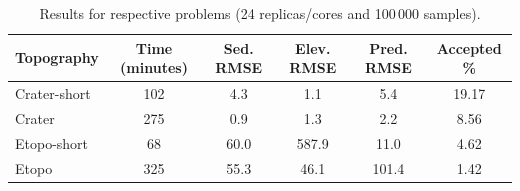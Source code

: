 \documentclass[final,5p,times,twocolumn]{elsarticle}
\begin{document}
 
 
 \begin{table}[htbp!]
 \centering
 \small
  \begin{tabular}{ l c c c c c} 
  \hline\hline
 Topography & Time (minutes) & Sed. RMSE &  Elev. RMSE   & Pred. RMSE & Accepted \%  \\  
  \hline\hline
 Crater-short & 	102	& 4.3	& 	1.1 &   5.4 & 19.17 \\
 Crater & 	275	& 0.9	& 1.3  	&  2.2 & 8.56 \\
 Etopo-short & 	68	& 60.0	& 587.9	&   11.0 &  4.62 \\
 Etopo &	325	& 55.3	& 46.1 &    101.4	 & 1.42 \\
  \hline
  \end{tabular}
 
 \caption{Results for respective problems (24 replicas/cores and 100\,000 samples). }
  \label{tab:all_res} 
 \end{table}
 

\end{document}

